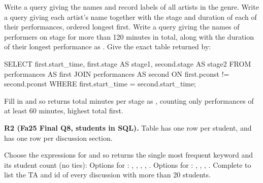 \documentclass[10pt]{scrartcl}
\begin{document}
\begin{prob}
\begin{enumerate}[(a)]
  \ii Write a query giving the names and record labels of all artists in the  genre.
  \ii Write a query giving each artist's name together with the stage and duration of each of their performances, ordered longest first.
  \ii Write a query giving the names of performers on stage for more than 120 minutes in total, along with the duration of their longest performance as .
  \ii Give the exact table returned by:
\begin{sql}
SELECT first.start_time, first.stage AS stage1, second.stage AS stage2
FROM   performances AS first JOIN performances AS second
ON     first.pconst != second.pconst
WHERE  first.start_time = second.start_time;
\end{sql}
  \ii Fill in  and  so  returns total minutes per stage as , counting only performances of at least 60 minutes, highest total first.
\end{enumerate}
\end{prob}

\begin{prob}
\textbf{R2 (Fa25 Final Q8, students in SQL).} Table  has one row per student, and  has one row per discussion section.
\begin{enumerate}[(a)]
  \ii Choose the expressions for  and  so  returns the single most frequent keyword and its student count (no ties):
  Options for : , , , , .
  Options for : , , , .
  \ii Complete  to list the TA and id of every discussion with more than 20 students.
\end{enumerate}
\end{prob}
\end{document}
